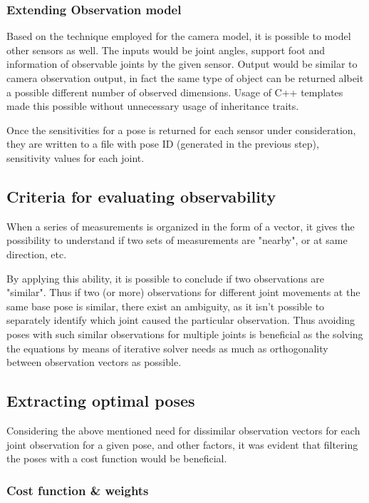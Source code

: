 \documentclass[english, printversion, nomenclature, notitle]{tuvisionthesis} %
\begin{document}
\subsubsection{Extending Observation model}

Based on the technique employed for the camera model, it is possible to model other sensors as well. The inputs would be joint angles, support foot and information of observable joints by the given sensor.
Output would be similar to camera observation output, in fact the same type of object can be returned albeit a possible different number of observed dimensions. Usage of C++ templates made this possible without unnecessary usage of inheritance traits. 

Once the sensitivities for a pose is returned for each sensor under consideration, they are written to a file with pose ID (generated in the previous step), sensitivity values for each joint. 
\subsection{Criteria for evaluating observability}

When a series of measurements is organized in the form of a vector, it gives the possibility to understand if two sets of measurements are "nearby", or at same direction, etc. 

By applying this ability, it is possible to conclude if two observations are "similar". Thus if two (or more) observations for different joint movements at the same base pose is similar, there exist an ambiguity, as it isn't possible to separately identify which joint caused the particular observation. Thus avoiding poses with such similar observations for multiple joints is beneficial as the solving the equations by means of iterative solver needs as much as orthogonality between observation vectors as possible.

\subsection{Extracting optimal poses}

Considering the above mentioned need for dissimilar observation vectors for each joint observation for a given pose, and other factors, it was evident that filtering the poses with a cost function would be beneficial.

\subsubsection{Cost function \& weights}
\end{document}
